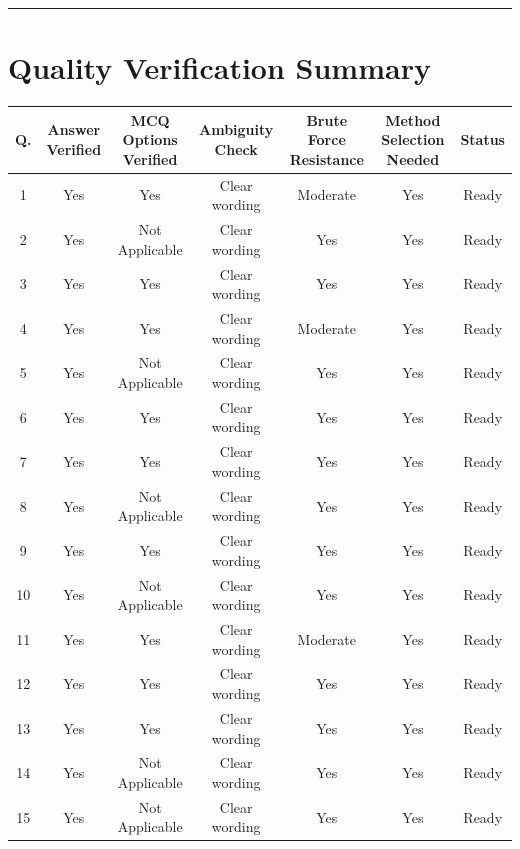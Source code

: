 \documentclass[11pt,a4paper]{article}
\begin{document}
\hrule

\section*{Quality Verification Summary}

\begin{center}
\begin{tabular}{|c|c|c|c|c|c|c|}
\hline
\textbf{Q.} & \textbf{Answer Verified} & \textbf{MCQ Options Verified} & \textbf{Ambiguity Check} & \textbf{Brute Force Resistance} & \textbf{Method Selection Needed} & \textbf{Status} \\
\hline
1  & Yes & Yes            & Clear wording & Moderate & Yes & Ready \\
2  & Yes & Not Applicable & Clear wording & Yes & Yes & Ready \\
3  & Yes & Yes            & Clear wording & Yes & Yes & Ready \\
4  & Yes & Yes            & Clear wording & Moderate & Yes & Ready \\
5  & Yes & Not Applicable & Clear wording & Yes & Yes & Ready \\
6  & Yes & Yes            & Clear wording & Yes & Yes & Ready \\
7  & Yes & Yes            & Clear wording & Yes & Yes & Ready \\
8  & Yes & Not Applicable & Clear wording & Yes & Yes & Ready \\
9  & Yes & Yes            & Clear wording & Yes & Yes & Ready \\
10 & Yes & Not Applicable & Clear wording & Yes & Yes & Ready \\
11 & Yes & Yes            & Clear wording & Moderate & Yes & Ready \\
12 & Yes & Yes            & Clear wording & Yes & Yes & Ready \\
13 & Yes & Yes            & Clear wording & Yes & Yes & Ready \\
14 & Yes & Not Applicable & Clear wording & Yes & Yes & Ready \\
15 & Yes & Not Applicable & Clear wording & Yes & Yes & Ready \\
\hline
\end{tabular}
\end{center}
\end{document}
